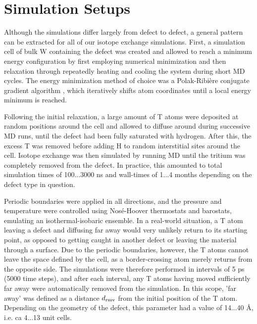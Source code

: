 \section{Simulation Setups}
Although the simulations differ largely from defect to defect, a general pattern can be extracted for all of our isotope exchange simulations. 
First, a simulation cell of bulk W containing the defect was created and allowed to reach a minimum energy configuration by first employing numerical minimization and then relaxation through repeatedly heating and cooling the system during short MD cycles. 
The energy minimization method of choice was a Polak-Ribi\`{e}re conjugate gradient algorithm \cite{polak1969note}, which iteratively shifts atom coordinates until a local energy minimum is reached. 

Following the initial relaxation, a large amount of T atoms were deposited at random positions around the cell and allowed to diffuse around during successive MD runs, until the defect had been fully saturated with hydrogen.
After this, the excess T was removed before adding H to random interstitial sites around the cell. 
Isotope exchange was then simulated by running MD until the tritium was completely removed from the defect.
In practice, this amounted to total simulation times of 100...3000 ns and wall-times of 1...4 months depending on the defect type in question. 

Periodic boundaries were applied in all directions, and the pressure and temperature were controlled using Nos\'{e}-Hoover thermostats and barostats, emulating an isothermal-isobaric ensemble. 
In a real-world situation, a T atom leaving a defect and diffusing far away would very unlikely return to its starting point, as opposed to getting caught in another defect or leaving the material through a surface. 
Due to the periodic boundaries, however, the T atoms cannot leave the space defined by the cell, as a border-crossing atom merely returns from the opposite side. 
The simulations were therefore performed in intervals of 5 ps (5000 time steps), and after each interval, any T atoms having moved sufficiently far away were automatically removed from the simulation. 
In this scope, 'far away' was defined as a distance $d_{\rm{rmv}} $ from the initial position of the T atom. 
Depending on the geometry of the defect, this parameter had a value of 14...40 \AA, i.e. ca 4...13 unit cells.

